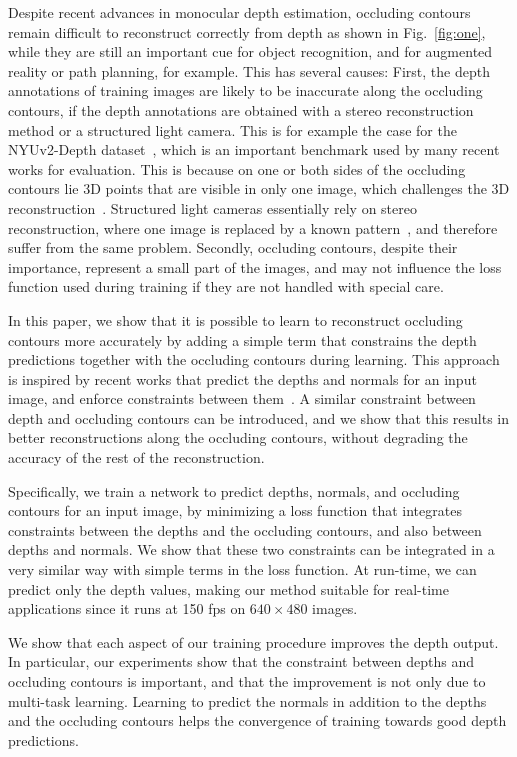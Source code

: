 \documentclass[10pt,twocolumn,letterpaper]{article}
\begin{document}
Despite recent advances in monocular depth estimation, occluding contours 
remain difficult to reconstruct correctly from depth as shown in 
Fig.~\ref{fig:one}, while they are still an important cue for object 
recognition, and for augmented reality or path planning, for example.  
This has several causes: First, the  depth annotations  of training  
images are  likely to  be inaccurate along the  occluding contours, if the 
depth  annotations are obtained with a stereo reconstruction method or a 
structured light  camera.  This is for example the case for the NYUv2-Depth 
dataset~\cite{Nyuv2}, which is an important benchmark used by many  recent 
works for evaluation. This is because on one or both sides of the occluding 
contours lie 3D points that are visible in only one image, which challenges the 
3D reconstruction~\cite{Szeliski11}. Structured light cameras essentially rely  
on stereo reconstruction, where one  image is replaced by a known 
pattern~\cite{Han13},  and therefore suffer  from the  same problem. Secondly, 
occluding contours, despite their  importance, represent a small part of the 
images, and may not influence the loss function used during training if they 
are not handled with special care.

In  this paper,  we  show that  it  is  possible to  learn to reconstruct 
occluding contours more accurately by adding a simple term that constrains the 
depth predictions together with the occluding contours during learning.  This 
approach is inspired  by recent works  that predict the depths  and normals 
for  an input image, and enforce constraints between 
them~\cite{WangSurgeNIPS16,Qi2018GeoNetGN,Yang2018lego}.  A similar constraint 
between depth and occluding contours can be introduced, and we show that 
this results in better reconstructions  along the  occluding  contours,  
without degrading  the accuracy of the rest of the reconstruction.

Specifically, we  train a  network to  predict depths,  normals, and  occluding
contours  for an  input image,  by minimizing  a loss function that integrates
constraints between the depths and the  occluding contours, and also between 
depths and normals. We show that  these two constraints can be integrated in
a very similar way with simple terms  in the loss function.  At run-time, we can
predict  only  the  depth  values,  making our  method suitable for real-time 
applications since it runs at 150 fps on $640\times 480$ images.

We show  that each aspect of  our training procedure improves  the depth output.
In  particular, our  experiments show  that  the constraint  between depths  and
occluding contours is  important, and that the improvement is not only due to 
multi-task learning.
Learning to  predict the normals in addition to  the depths and the occluding  
contours  helps  the  convergence  of  training  towards  good  depth
predictions.
\end{document}
